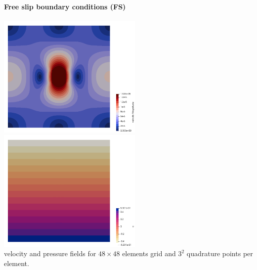 \paragraph{Free slip boundary conditions (FS)}

\begin{center}
\includegraphics[width=7cm]{python_codes/fieldstone_18/results/block/FS/vel}
\includegraphics[width=7cm]{python_codes/fieldstone_18/results/block/FS/press}\\
{\captionfont velocity and pressure fields for $48\times 48$ elements grid and $3^2$
quadrature points per element.}
\end{center}


